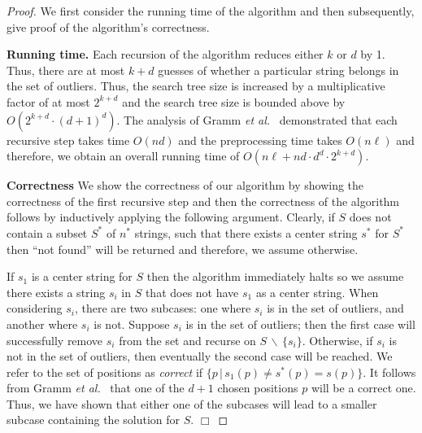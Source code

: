 \begin{proof}  We first consider the running time of the algorithm and then subsequently, give proof of the algorithm's correctness.

{\bf Running time.} Each recursion of the algorithm reduces either $k$ or $d$ by 1.  Thus, there are at most $k+d$ guesses of whether a particular string belongs in the set of outliers. Thus, the search tree size is increased by a multiplicative factor of at most $2^{k+d}$ and the search tree size is bounded above by $O(2^{k+d} \cdot (d+1)^d)$.  The analysis of Gramm {\em et al.}\ \cite{GNR03} demonstrated that each recursive step takes time $O(nd)$ and the preprocessing time takes $O(n\ell)$ and therefore, we obtain an overall running time of $O(n \ell + n d \cdot d^d \cdot 2^{k+d})$.

{\bf Correctness} We show the correctness of our algorithm by showing the correctness of the first recursive step and then the correctness of the algorithm follows by inductively applying the following argument.  Clearly, if $S$ does not contain a subset $S^*$ of $n^*$ strings, such that there exists a center string $s^*$ for $S^*$ then ``not found'' will be returned and therefore, we assume otherwise.  

If $s_1$ is a center string for $S$ then the algorithm immediately halts so we assume there exists a string $s_i$ in $S$ that does not have $s_1$ as a center string.  When considering $s_i$, there are two subcases: one where $s_i$ is in the set of outliers, and another where $s_i$ is not.  Suppose $s_i$ is in the set of outliers; then the first case will successfully remove $s_i$ from the set and recurse on $S \, \backslash \, \{s_i \}$.  Otherwise, if $s_i$ is not in the set of outliers, then eventually the second case will be reached. We refer to the set of positions as {\em correct} if $\{ p \, | \, s_1(p) \ne s^*(p) = s(p)\}$.  It follows from Gramm {\em et al.}\ \cite{GNR03} that one of the $d + 1$ chosen positions $p$ will be a correct one. Thus, we have shown that either one of the subcases will lead to a smaller subcase containing the solution for $S$.  \hfill $\Box$ \end{proof} 

